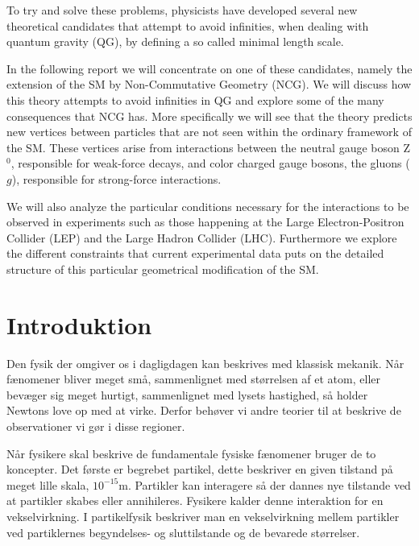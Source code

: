 To try and solve these problems, physicists have developed several new theoretical candidates that attempt to avoid infinities, when dealing with quantum gravity (QG), by defining a so called minimal length scale.

In the following report we will concentrate on one of these candidates, namely the extension of the SM by Non-Commutative Geometry (NCG). We will discuss how this theory attempts to avoid infinities in QG and explore some of the many consequences that NCG has. More specifically we will see that the theory predicts new vertices between particles that are not seen within the ordinary framework of the SM. These vertices arise from interactions between the neutral gauge boson Z$^0$, responsible for weak-force decays, and color charged gauge bosons, the gluons ($g$), responsible for strong-force interactions.

We will also analyze the particular conditions necessary for the interactions to be observed in experiments such as those happening at the Large Electron-Positron Collider (LEP) and the Large Hadron Collider (LHC). Furthermore we explore the different constraints that current experimental data puts on the detailed structure of this particular geometrical modification of the SM.

\newpage
\section{Introduktion}
Den fysik der omgiver os i dagligdagen kan beskrives med klassisk mekanik. Når fænomener bliver meget små, sammenlignet med størrelsen af et atom, eller bevæger sig meget hurtigt, sammenlignet med lysets hastighed, så holder Newtons love op med at virke. Derfor behøver vi andre teorier til at beskrive de observationer vi gør i disse regioner.

Når fysikere skal beskrive de fundamentale fysiske fænomener bruger de to koncepter. Det første er begrebet partikel, dette beskriver en given tilstand på meget lille skala, $10^{-15}$m. Partikler kan interagere så der dannes nye tilstande ved at partikler skabes eller annihileres. Fysikere kalder denne interaktion for en vekselvirkning. I partikelfysik beskriver man en vekselvirkning mellem partikler ved partiklernes begyndelses- og sluttilstande og de bevarede størrelser.

